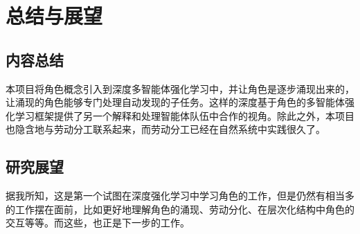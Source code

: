 
\chapter{总结与展望}

\section{内容总结}
本项目将角色概念引入到深度多智能体强化学习中，并让角色是逐步涌现出来的，让涌现的角色能够专门处理自动发现的子任务。这样的深度基于角色的多智能体强化学习框架提供了另一个解释和处理智能体队伍中合作的视角。除此之外，本项目也隐含地与劳动分工联系起来，而劳动分工已经在自然系统中实践很久了。

\section{研究展望}
据我所知，这是第一个试图在深度强化学习中学习角色的工作，但是仍然有相当多的工作摆在面前，比如更好地理解角色的涌现、劳动分化、在层次化结构中角色的交互等等。而这些，也正是下一步的工作。

